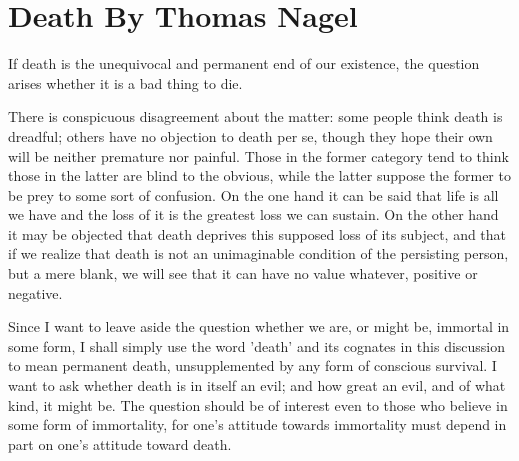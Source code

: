 \chapter{Death By Thomas Nagel}\autocite{Nagel2}
\label{death}

If death is the unequivocal and permanent end of our existence, the question
arises whether it is a bad thing to die.

There is conspicuous disagreement about the matter: some people think death
is dreadful; others have no objection to death per se, though they hope their
own will be neither premature nor painful. Those in the former category tend to
think those in the latter are blind to the obvious, while the latter suppose the
former to be prey to some sort of confusion. On the one hand it can be said
that life is all we have and the loss of it is the greatest loss we can sustain. On
the other hand it may be objected that death deprives this supposed loss of its
subject, and that if we realize that death is not an unimaginable condition of the
persisting person, but a mere blank, we will see that it can have no value
whatever, positive or negative.

Since I want to leave aside the question whether we are, or might be, immortal
in some form, I shall simply use the word 'death' and its cognates in this
discussion to mean permanent death, unsupplemented by any form of
conscious survival. I want to ask whether death is in itself an evil; and how great
an evil, and of what kind, it might be. The question should be of interest even
to those who believe in some form of immortality, for one's attitude towards
immortality must depend in part on one's attitude toward death.

